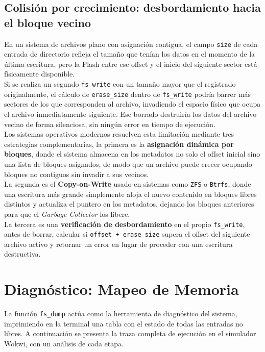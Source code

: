 \documentclass[12pt,letterpaper]{article}
\begin{document}
\subsection*{Colisión por crecimiento: desbordamiento hacia el bloque vecino}
En un sistema de archivos plano con asignación contigua, el campo \texttt{size} de cada entrada de directorio
refleja el tamaño que tenían los datos en el momento de la última escritura, pero la Flash entre ese offset y el
inicio del siguiente sector está físicamente disponible.\\
Si se realiza un segundo \texttt{fs\_write} con un tamaño mayor que el registrado originalmente, el cálculo de
\texttt{erase\_size} dentro de \texttt{fs\_write} podría barrer más sectores de los que corresponden al archivo,
invadiendo el espacio físico que ocupa el archivo inmediatamente siguiente. Ese borrado destruiría los datos del
archivo vecino de forma silenciosa, sin ningún error en tiempo de ejecución.\\

Los sistemas operativos modernos resuelven esta limitación mediante tres estrategias complementarias, la primera
es la \textbf{asignación dinámica por bloques}, donde el sistema almacena en los metadatos no solo el offset
inicial sino una lista de bloques asignados, de modo que un archivo puede crecer ocupando bloques no contiguos
sin invadir a sus vecinos.\\
La segunda es el \textbf{Copy-on-Write} usado en sistemas como \texttt{ZFS} o \texttt{Btrfs}, donde una escritura
más grande simplemente aloja el nuevo contenido en bloques libres distintos y actualiza el puntero en los
metadatos, dejando los bloques anteriores para que el \textit{Garbage Collector} los libere.\\
La tercera es una \textbf{verificación de desbordamiento} en el propio \texttt{fs\_write}, antes de borrar,
calcular si \texttt{offset + erase\_size} supera el offset del siguiente archivo activo y retornar un error en
lugar de proceder con una escritura destructiva.


\newpage


\section*{Diagnóstico: Mapeo de Memoria}
La función \texttt{fs\_dump} actúa como la herramienta de diagnóstico del sistema, imprimiendo en la terminal una
tabla con el estado de todas las entradas no libres. A continuación se presenta la traza completa de ejecución en
el simulador Wokwi, con un análisis de cada etapa.
\end{document}
